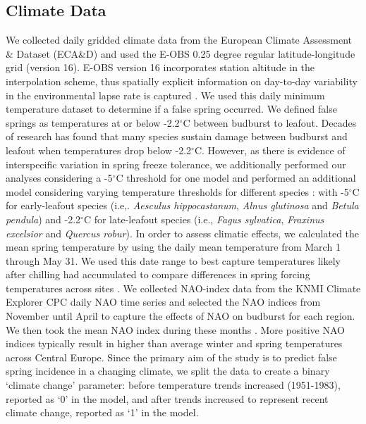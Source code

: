 \documentclass{article}\usepackage[]{graphicx}\usepackage[]{color}
\newcommand{\R}[1]{\label{#1}\linelabel{#1}}
\begin{document}
\subsection*{Climate Data} 
We collected daily gridded climate data from the European Climate Assessment \& Dataset (ECA\&D) and used the E-OBS 0.25 degree regular latitude-longitude grid (version 16). \R{R2clim}E-OBS version 16 incorporates station altitude in the interpolation scheme, thus spatially explicit information on day-to-day variability in the environmental lapse rate is captured \citep{Cornes2018}\R{R2climend}. We used this daily minimum temperature dataset to determine if a false spring occurred. We defined false springs as temperatures at or below -2.2$^{\circ}$C \citep{Schwartz1993} between budburst to leafout. Decades of research has found that many species sustain damage between budburst and leafout when temperatures drop below -2.2$^{\circ}$C. However, as there is evidence of interspecific variation in spring freeze tolerance, we additionally performed our analyses considering a -5$^{\circ}$C \citep{Sakai1987,Lenz2013} threshold for one model and performed an additional model considering varying temperature thresholds for different species \citep{Lenz2016,Muffler2016,Zohner2020}: with -5$^{\circ}$C for early-leafout species (i.e,. \textit{Aesculus hippocastanum}, \textit{Alnus glutinosa} and \textit{Betula pendula}) and -2.2$^{\circ}$C for late-leafout species (i.e., \textit{Fagus sylvatica}, \textit{Fraxinus excelsior} and \textit{Quercus robur}). In order to assess climatic effects, we calculated the mean spring temperature by using the daily mean temperature from March 1 through May 31. We used this date range to best capture temperatures likely after chilling had accumulated to compare differences in spring forcing temperatures across sites \citep{Basler2012, Korner2016}. We collected NAO-index data from the KNMI Climate Explorer CPC daily NAO time series and selected the NAO indices from November until April to capture the effects of NAO on budburst for each region. We then took the mean NAO index during these months \citep{NAOdata}. More positive NAO indices typically result in higher than average winter and spring temperatures across Central Europe. Since the primary aim of the study is to predict false spring incidence in a changing climate, we split the data to create a binary `climate change' parameter: before temperature trends increased (1951-1983), reported as `0' in the model, and after trends increased \citep[1984-2016,][]{Stocker2013,Kharouba2018} to represent recent climate change, reported as `1' in the model.
\end{document}
